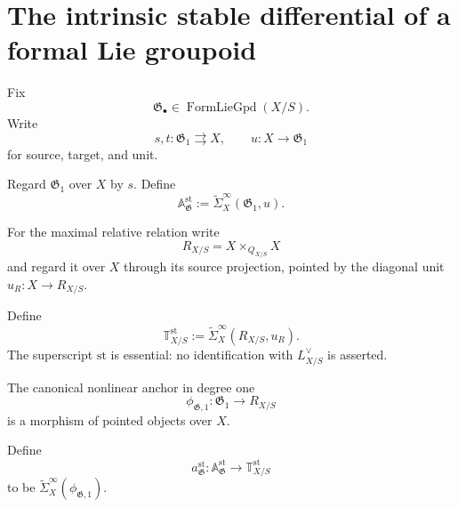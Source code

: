 \section{The intrinsic stable differential of a formal Lie groupoid}
\label{sec:bnla-stable-differential}

Fix
\[
    \mathfrak G_\bullet
    \in
    \operatorname{FormLieGpd}(X/S).
\]
Write
\[
    s,t:\mathfrak G_1\rightrightarrows X,
    \qquad
    u:X\longrightarrow\mathfrak G_1
\]
for source, target, and unit.

\begin{definition}
\label{def:bnla-stable-arrow-coefficient}
Regard $\mathfrak G_1$ over $X$ by $s$.  Define
\[
    \mathbb A^{\mathrm{st}}_{\mathfrak G}
    :=
    \widetilde\Sigma^\infty_X
    (\mathfrak G_1,u).
\]
\end{definition}

For the maximal relative relation write
\[
    R_{X/S}
    =
    X\times_{Q_{X/S}}X
\]
and regard it over $X$ through its source projection, pointed by the diagonal
unit $u_R:X\to R_{X/S}$.

\begin{definition}
\label{def:bnla-stable-relative-tangent}
Define
\[
    \mathbb T^{\mathrm{st}}_{X/S}
    :=
    \widetilde\Sigma^\infty_X
    (R_{X/S},u_R).
\]
The superscript $\mathrm{st}$ is essential: no identification with
$L_{X/S}^{\vee}$ is asserted.
\end{definition}

The canonical nonlinear anchor in degree one
\[
    \phi_{\mathfrak G,1}:
    \mathfrak G_1\longrightarrow R_{X/S}
\]
is a morphism of pointed objects over $X$.

\begin{definition}
\label{def:bnla-stable-anchor}
Define
\[
    a^{\mathrm{st}}_{\mathfrak G}:
    \mathbb A^{\mathrm{st}}_{\mathfrak G}
    \longrightarrow
    \mathbb T^{\mathrm{st}}_{X/S}
\]
to be $\widetilde\Sigma^\infty_X(\phi_{\mathfrak G,1})$.
\end{definition}

